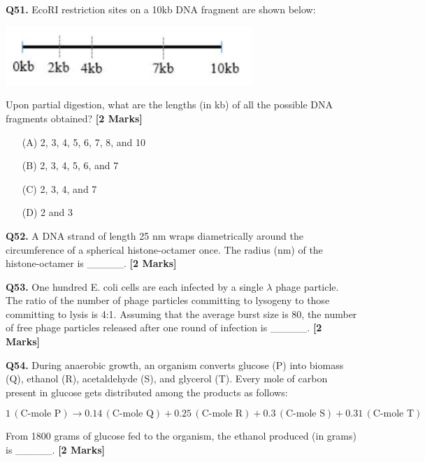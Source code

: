 \documentclass[11pt]{article}
\newcommand{\questionb}[2]{
    \noindent\textbf{Q#2.} #1 \hfill \textbf{[2 Marks]}
}
\begin{document}
\questionb{EcoRI restriction sites on a 10kb DNA fragment are shown below:

\begin{center}
\includegraphics[width=0.7\textwidth]{figures/51.png}
\end{center}

Upon partial digestion, what are the lengths (in kb) of all the possible DNA fragments obtained?}{51}
\begin{enumerate}
    \item[(A)] 2, 3, 4, 5, 6, 7, 8, and 10
    \item[(B)] 2, 3, 4, 5, 6, and 7  
    \item[(C)] 2, 3, 4, and 7
    \item[(D)] 2 and 3
\end{enumerate}

\vspace{0.5cm}

\questionb{A DNA strand of length 25 nm wraps diametrically around the circumference of a spherical histone-octamer once. The radius (nm) of the histone-octamer is \_\_\_\_\_.}{52}

\vspace{0.5cm}

\questionb{One hundred E. coli cells are each infected by a single $\lambda$ phage particle. The ratio of the number of phage particles committing to lysogeny to those committing to lysis is 4:1. Assuming that the average burst size is 80, the number of free phage particles released after one round of infection is \_\_\_\_\_.}{53}

\vspace{0.5cm}

\questionb{During anaerobic growth, an organism converts glucose (P) into biomass (Q), ethanol (R), acetaldehyde (S), and glycerol (T). Every mole of carbon present in glucose gets distributed among the products as follows:

\[1 \, (\text{C-mole P}) \rightarrow 0.14 \, (\text{C-mole Q}) + 0.25 \, (\text{C-mole R}) + 0.3 \, (\text{C-mole S}) + 0.31 \, (\text{C-mole T})\]

From 1800 grams of glucose fed to the organism, the ethanol produced (in grams) is \_\_\_\_\_.}{54}
\end{document}
